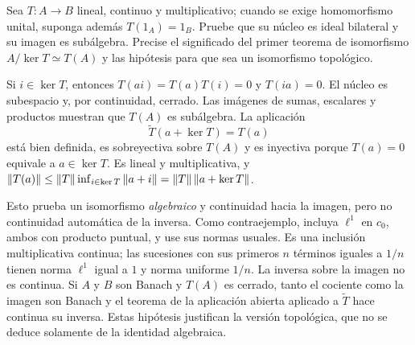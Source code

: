 \begin{ejercicio}\label{ej:v3-l19-5}
Sea $T:A\to B$ lineal, continuo y multiplicativo; cuando se exige homomorfismo unital, suponga además $T(1_A)=1_B$. Pruebe que su núcleo es ideal bilateral y su imagen es subálgebra. Precise el significado del primer teorema de isomorfismo $A/\ker T\simeq T(A)$ y las hipótesis para que sea un isomorfismo topológico.
\end{ejercicio}
\begin{solucion}
Si $i\in\ker T$, entonces $T(ai)=T(a)T(i)=0$ y $T(ia)=0$. El núcleo es subespacio y, por continuidad, cerrado. Las imágenes de sumas, escalares y productos muestran que $T(A)$ es subálgebra. La aplicación
\[
 \widetilde T(a+\ker T)=T(a)
\]
está bien definida, es sobreyectiva sobre $T(A)$ y es inyectiva porque $T(a)=0$ equivale a $a\in\ker T$. Es lineal y multiplicativa, y
$\left\lVert T(a)\right\rVert\leq\left\lVert T\right\rVert\inf_{i\in\ker T}\left\lVert a+i\right\rVert=\left\lVert T\right\rVert\left\lVert a+\ker T\right\rVert$.

Esto prueba un isomorfismo \emph{algebraico} y continuidad hacia la imagen, pero no continuidad automática de la inversa. Como contraejemplo, incluya $\ell^1$ en $c_0$, ambos con producto puntual, y use sus normas usuales. Es una inclusión multiplicativa continua; las sucesiones con sus primeros $n$ términos iguales a $1/n$ tienen norma $\ell^1$ igual a $1$ y norma uniforme $1/n$. La inversa sobre la imagen no es continua. Si $A$ y $B$ son Banach y $T(A)$ es cerrado, tanto el cociente como la imagen son Banach y el teorema de la aplicación abierta aplicado a $\widetilde T$ hace continua su inversa. Estas hipótesis justifican la versión topológica, que no se deduce solamente de la identidad algebraica.
\end{solucion}

